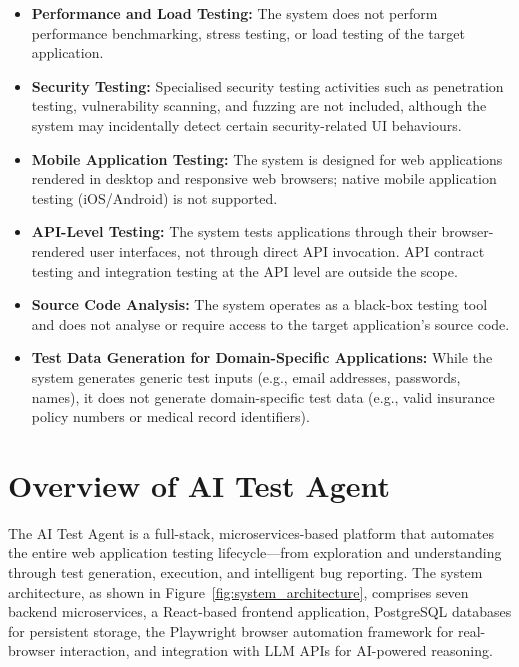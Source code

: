 \begin{itemize}
    \item \textbf{Performance and Load Testing:} The system does not perform performance benchmarking, stress testing, or load testing of the target application.

    \item \textbf{Security Testing:} Specialised security testing activities such as penetration testing, vulnerability scanning, and fuzzing are not included, although the system may incidentally detect certain security-related UI behaviours.

    \item \textbf{Mobile Application Testing:} The system is designed for web applications rendered in desktop and responsive web browsers; native mobile application testing (iOS/Android) is not supported.

    \item \textbf{API-Level Testing:} The system tests applications through their browser-rendered user interfaces, not through direct API invocation. API contract testing and integration testing at the API level are outside the scope.

    \item \textbf{Source Code Analysis:} The system operates as a black-box testing tool and does not analyse or require access to the target application's source code.

    \item \textbf{Test Data Generation for Domain-Specific Applications:} While the system generates generic test inputs (e.g., email addresses, passwords, names), it does not generate domain-specific test data (e.g., valid insurance policy numbers or medical record identifiers).
\end{itemize}


\section{Overview of AI Test Agent}
\label{sec:system_overview}

The AI Test Agent is a full-stack, microservices-based platform that automates the entire web application testing lifecycle---from exploration and understanding through test generation, execution, and intelligent bug reporting. The system architecture, as shown in Figure~\ref{fig:system_architecture}, comprises seven backend microservices, a React-based frontend application, PostgreSQL databases for persistent storage, the Playwright browser automation framework for real-browser interaction, and integration with LLM APIs for AI-powered reasoning.

